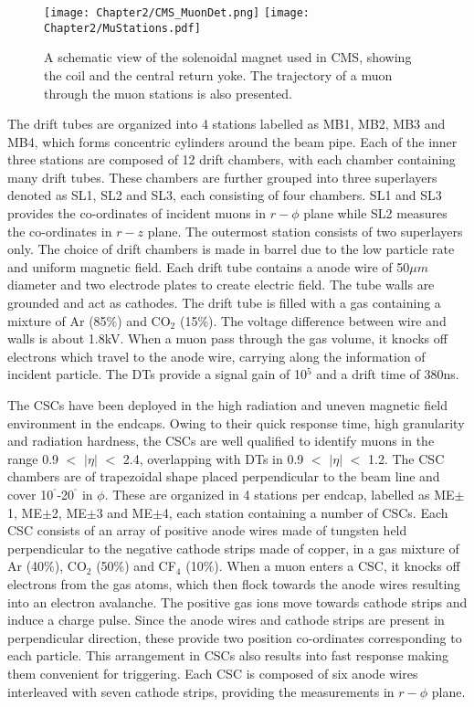 \begin{figure}[h]
\begin{center}
\texttt{[image: Chapter2/CMS\_MuonDet.png]}
\texttt{[image: Chapter2/MuStations.pdf]}
\caption{A schematic view of the solenoidal magnet used in CMS, showing the coil and the central return yoke. The trajectory of a muon through the muon stations is also presented.}
\label{fig:CMS_Muon}
\end{center}
\end{figure}
\vspace{-0.3in}

The drift tubes are organized into 4 stations labelled as MB1, MB2, MB3 and MB4, which forms concentric cylinders around the beam pipe.
Each of the inner three stations are composed of 12 drift chambers, with each chamber containing many drift tubes. These chambers are further grouped into
three superlayers denoted as SL1, SL2 and SL3, each consisting of four chambers. SL1 and SL3 provides
the co-ordinates of incident muons in $r-\phi$ plane while SL2 measures the co-ordinates in $r-z$ plane. The outermost station consists of two superlayers only. 
The choice of drift chambers is made in barrel due to the low particle rate and
uniform magnetic field. Each drift tube contains a anode wire of 50$\mu{m}$ diameter and two electrode plates to create electric field. The tube walls
are grounded and act as cathodes. The drift tube is filled with a gas containing a mixture of Ar (85$\%$) and CO$_{2}$ (15$\%$). The voltage difference between
wire and walls is about 1.8\unit{kV}. When a muon pass through the gas volume, it knocks off electrons which travel to the anode wire, carrying along
the information of incident particle. The DTs provide a signal gain of 10$^{5}$ and a drift time of 380\unit{ns}. 

The CSCs have been deployed in the high radiation and uneven magnetic field environment in the endcaps. Owing to their quick response time, high granularity and
radiation hardness, the CSCs are well qualified to identify muons in the range 0.9 $<$ $|\eta|$ $<$ 2.4, overlapping with DTs in 0.9 $<$ $|\eta|$ $<$ 1.2.
The CSC chambers are of trapezoidal shape placed perpendicular to the beam line and cover
10$^{^{\circ}}$-20$^{^{\circ}}$ in $\phi$. These are organized in 4 stations per endcap, labelled as ME$\pm$1, ME$\pm$2, ME$\pm$3 and ME$\pm$4, each station
containing a number of CSCs. Each CSC consists of an array of positive anode wires made of tungsten held perpendicular to the negative cathode strips made of
copper, in a gas mixture of Ar (40$\%$), CO$_{2}$ (50$\%$) and CF$_{4}$ (10$\%$). When a muon enters a CSC, it knocks off electrons from the gas atoms, which then
flock towards the anode wires resulting into an electron avalanche. The positive gas ions move towards cathode strips and induce a charge pulse. Since the
anode wires and cathode strips are present in perpendicular direction, these provide two position co-ordinates corresponding to each particle. This arrangement in
CSCs also results into fast response making them convenient for triggering. Each CSC is composed of six anode wires interleaved with seven cathode strips, providing
the measurements in $r-\phi$ plane. 

